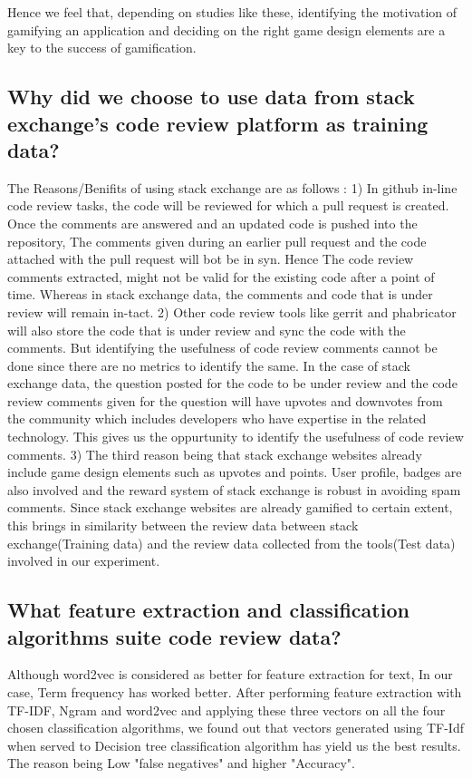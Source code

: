 \documentclass[conference]{IEEEtran}
\begin{document}
Hence we feel that, depending on studies like these, identifying the motivation of gamifying an application and deciding on the right game design elements are a key to the success of gamification.

\subsection{Why did we choose to use data from stack exchange's code review platform as training data? }
The Reasons/Benifits of using stack exchange are as follows :  1) In github in-line code review tasks, the code will be reviewed for which a pull request is created. Once the comments are answered and an updated code is pushed into the repository, The comments given during an earlier pull request and the code attached with the pull request will bot be in syn. Hence The code review comments extracted, might not be valid for the existing code after a point of time. Whereas in stack exchange data, the comments and code that is under review will remain in-tact. 2)  Other code review tools like gerrit and phabricator will also store the code that is under review and sync the code with the comments. But identifying the usefulness of code review comments cannot be done since there are no metrics to identify the same. In the case of stack exchange data, the question posted for the code to be under review and the code review comments given for the question will have upvotes and downvotes from the community which includes developers who have expertise in the related technology. This gives us the oppurtunity to identify the usefulness of code review comments. 3) The third reason being that stack exchange websites already include game design elements such as upvotes and points. User profile, badges are also involved and the reward system of stack exchange is robust in avoiding spam comments. Since stack exchange websites are already gamified to certain extent, this brings in similarity between the review data between stack exchange(Training data) and the review data collected from the tools(Test data) involved in our experiment. 

\subsection{What feature extraction and classification algorithms suite code review data?}
Although word2vec is considered as better for feature extraction for text, In our case, Term frequency has worked better. After performing feature extraction with TF-IDF, Ngram and word2vec and applying these three vectors on all the four chosen classification algorithms, we found out that vectors generated using TF-Idf when served to Decision tree classification algorithm has yield us the best results. The reason being Low "false negatives" and higher "Accuracy".
\end{document}
